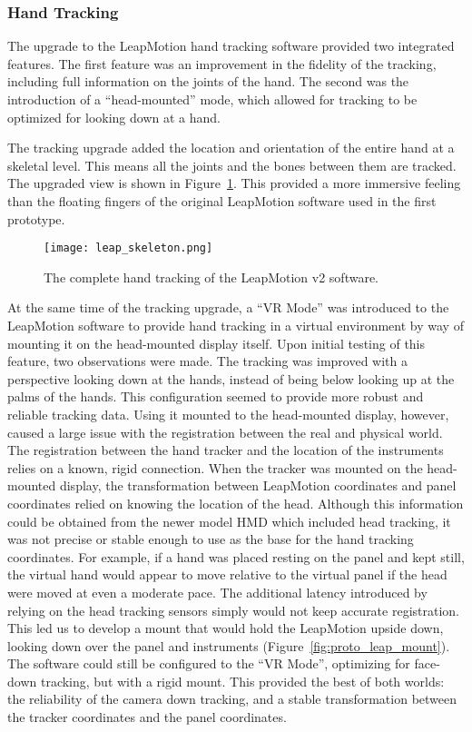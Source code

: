 \subsubsection{Hand Tracking}
\label{sec:proto-hand-tracking}

The upgrade to the LeapMotion hand tracking software provided two integrated features.
The first feature was an improvement in the fidelity of the tracking, including full information on the joints of the hand.
The second was the introduction of a ``head-mounted'' mode, which allowed for tracking to be optimized for looking down at a hand.

The tracking upgrade added the location and orientation of the entire hand at a skeletal level.
This means all the joints and the bones between them are tracked.
The upgraded view is shown in Figure~\ref{fig:proto_skeleton}.
This provided a more immersive feeling than the floating fingers of the original LeapMotion software used in the first prototype.

\begin{figure}
    \centering
    \texttt{[image: leap\_skeleton.png]}
    \caption{The complete hand tracking of the LeapMotion v2 software.}
    \label{fig:proto_skeleton}
\end{figure}

At the same time of the tracking upgrade, a ``VR Mode'' was introduced to the LeapMotion software to provide hand tracking in a virtual environment by way of mounting it on the head-mounted display itself.
Upon initial testing of this feature, two observations were made.
The tracking was improved with a perspective looking down at the hands, instead of being below looking up at the palms of the hands.
This configuration seemed to provide more robust and reliable tracking data.
Using it mounted to the head-mounted display, however, caused a large issue with the registration between the real and physical world.
The registration between the hand tracker and the location of the instruments relies on a known, rigid connection.
When the tracker was mounted on the head-mounted display, the transformation between LeapMotion coordinates and panel coordinates relied on knowing the location of the head.
Although this information could be obtained from the newer model HMD which included head tracking, it was not precise or stable enough to use as the base for the hand tracking coordinates.
For example, if a hand was placed resting on the panel and kept still, the virtual hand would appear to move relative to the virtual panel if the head were moved at even a moderate pace.
The additional latency introduced by relying on the head tracking sensors simply would not keep accurate registration.
This led us to develop a mount that would hold the LeapMotion upside down, looking down over the panel and instruments (Figure~\ref{fig:proto_leap_mount}).
The software could still be configured to the ``VR Mode'', optimizing for face-down tracking, but with a rigid mount.
This provided the best of both worlds: the reliability of the camera down tracking, and a stable transformation between the tracker coordinates and the panel coordinates.

